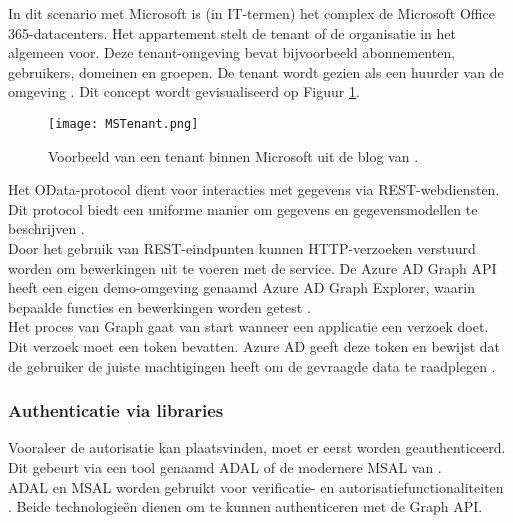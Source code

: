 In dit scenario met Microsoft is (in \ac{IT}-termen) het complex de Microsoft Office 365-datacenters. Het appartement stelt de tenant of de organisatie in het algemeen voor. Deze tenant-omgeving bevat bijvoorbeeld abonnementen, gebruikers, domeinen en groepen. De tenant wordt gezien als een huurder van de omgeving \autocite{Saxton2015}. Dit concept wordt gevisualiseerd op Figuur \ref{mst}. \\

\begin{figure}[h!]
    \texttt{[image: MSTenant.png]}
    \caption[Voorbeeld Microsoft tenant]{Voorbeeld van een tenant binnen Microsoft uit de blog van \textcite{Saxton2015}.}
    \label{mst}
\end{figure}

Het OData-protocol dient voor interacties met gegevens via \ac{REST}-webdiensten. Dit protocol biedt een uniforme manier om gegevens en gegevensmodellen te beschrijven \autocite{OData2023}. \\

Door het gebruik van \ac{REST}-eindpunten kunnen \ac{HTTP}-verzoeken verstuurd worden om bewerkingen uit te voeren met de service. De Azure \ac{AD} Graph \ac{API} heeft een eigen demo-omgeving genaamd Azure \ac{AD} Graph Explorer, waarin bepaalde functies en bewerkingen worden getest \autocite{Microsoft}. \\

Het proces van Graph gaat van start wanneer een applicatie een verzoek doet. Dit verzoek moet een token bevatten. Azure \ac{AD} geeft deze token en bewijst dat de gebruiker de juiste machtigingen heeft om de gevraagde data te raadplegen \autocite{Microsoft2015}.



\subsubsection{Authenticatie via libraries}


Vooraleer de autorisatie kan plaatsvinden, moet er eerst worden geauthenticeerd. Dit gebeurt via een tool genaamd \ac{ADAL} of de modernere \ac{MSAL} van \textcite{Microsoft2022d}. \\

\ac{ADAL} en \ac{MSAL} worden gebruikt voor verificatie- en autorisatiefunctionaliteiten \autocite{Ooms2022}. Beide technologieën dienen om te kunnen authenticeren met de Graph \ac{API}. \\ 

